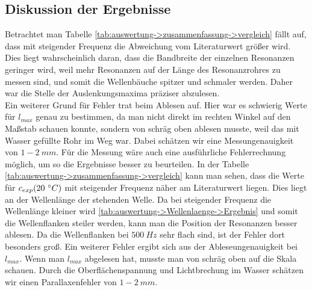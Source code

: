 \subsection{Diskussion der Ergebnisse}
\label{sub:auswertung->Diskussion}
Betrachtet man Tabelle \ref{tab:auswertung->zusammenfassung->vergleich} fällt auf, dass mit steigender Frequenz die Abweichung vom Literaturwert größer wird. Dies liegt wahrscheinlich daran, dass die Bandbreite der einzelnen Resonanzen geringer wird, weil mehr Resonanzen auf der Länge des Resonanzrohres zu messen sind, und somit die Wellenbäuche spitzer und schmaler werden. Daher war die Stelle der Auslenkungsmaxima präziser abzulesen. \\
Ein weiterer Grund für Fehler trat beim Ablesen auf. Hier war es schwierig Werte für $l_{max}$ genau zu bestimmen, da man nicht direkt im rechten Winkel auf den Maßstab schauen konnte, sondern von schräg oben ablesen musste, weil das mit Wasser gefüllte Rohr im Weg war. Dabei schätzen wir eine Messungenauigkeit von $1-2~mm$. 
Für die Messung wäre auch eine ausführliche Fehlerrechnung möglich, um so die Ergebnisse besser zu beurteilen.
In der Tabelle \ref{tab:auswertung->zusammenfassung->vergleich} kann man sehen, dass die Werte für $c_{exp}(20 ~^\circ C)$ mit steigender Frequenz näher am Literaturwert liegen. Dies liegt an der Wellenlänge der stehenden Welle.
Da bei steigender Frequenz die Wellenlänge kleiner wird \ref{tab:auswertung->Wellenlaenge->Ergebnis} und somit die Wellenflanken steiler werden, kann man die Position der Resonanzen besser ablesen.
Da die Wellenflanken bei $500 ~Hz$ sehr flach sind, ist der Fehler dort besonders groß.
Ein weiterer Fehler ergibt sich aus der Ableseungenauigkeit  bei $l_{max}$.
Wenn man $l_{max}$ abgelesen hat, musste man von schräg oben auf die Skala schauen.
Durch die Oberflächenspannung und Lichtbrechung im Wasser schätzen wir einen Parallaxenfehler von $1-2 ~mm$.